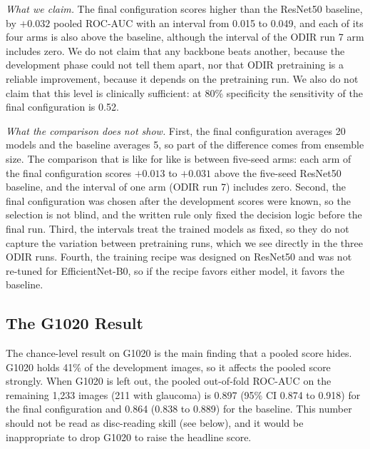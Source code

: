 \textit{What we claim.} The final configuration scores higher than the ResNet50 baseline, by $+0.032$ pooled ROC-AUC with an interval from 0.015 to 0.049, and each of its four arms is also above the baseline, although the interval of the ODIR run 7 arm includes zero. We do not claim that any backbone beats another, because the development phase could not tell them apart, nor that ODIR pretraining is a reliable improvement, because it depends on the pretraining run. We also do not claim that this level is clinically sufficient: at 80\% specificity the sensitivity of the final configuration is 0.52.

\textit{What the comparison does not show.} First, the final configuration averages 20 models and the baseline averages 5, so part of the difference comes from ensemble size. The comparison that is like for like is between five-seed arms: each arm of the final configuration scores $+0.013$ to $+0.031$ above the five-seed ResNet50 baseline, and the interval of one arm (ODIR run 7) includes zero. Second, the final configuration was chosen after the development scores were known, so the selection is not blind, and the written rule only fixed the decision logic before the final run. Third, the intervals treat the trained models as fixed, so they do not capture the variation between pretraining runs, which we see directly in the three ODIR runs. Fourth, the training recipe was designed on ResNet50 and was not re-tuned for EfficientNet-B0, so if the recipe favors either model, it favors the baseline.

\subsection{The G1020 Result}
The chance-level result on G1020 is the main finding that a pooled score hides. G1020 holds 41\% of the development images, so it affects the pooled score strongly. When G1020 is left out, the pooled out-of-fold ROC-AUC on the remaining 1,233 images (211 with glaucoma) is 0.897 (95\% CI 0.874 to 0.918) for the final configuration and 0.864 (0.838 to 0.889) for the baseline. This number should not be read as disc-reading skill (see below), and it would be inappropriate to drop G1020 to raise the headline score.

